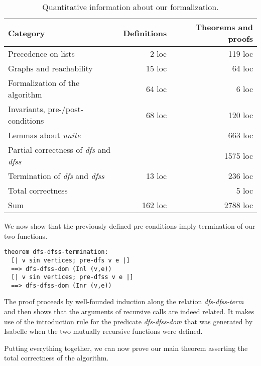 \documentclass[sigplan,10pt,anonymous,review]{acmart}
\newcommand{\prog}[1]{\textit{#1}}
\begin{document}
\begin{table*}
  \centering
  \begin{tabular}{|l|r|r|}
    \hline
    Category                         &  Definitions   &  Theorems and proofs\\
    \hline\hline
    Precedence on lists              &        2 loc   &         119 loc\\
    \hline
    Graphs and reachability          &       15 loc   &          64 loc\\
    \hline
    Formalization of the algorithm   &       64 loc   &           6 loc\\
    \hline
    Invariants, pre-/post-conditions &       68 loc   &         120 loc\\
    \hline
    Lemmas about \prog{unite}        &                &         663 loc\\
    \hline
    Partial correctness of \prog{dfs} and \prog{dfss} &  &     1575 loc\\
    \hline
    Termination of \prog{dfs} and \prog{dfss} & 13 loc   &      236 loc\\
    \hline
    Total correctness                &                &           5 loc\\
    \hline\hline
    Sum                              &      162 loc   &        2788 loc\\
    \hline
  \end{tabular}
  \caption{Quantitative information about our formalization.}
  \label{tab:effort}
\end{table*}

We now show that the previously defined pre-conditions imply termination of our two functions.

\begin{small}
\begin{lstlisting}[language=isabelle]
theorem dfs-dfss-termination:
  [| v sin vertices; pre-dfs v e |] 
  ==> dfs-dfss-dom (Inl (v,e))
  [| v sin vertices; pre-dfss v e |] 
  ==> dfs-dfss-dom (Inr (v,e))
\end{lstlisting}
\end{small}

The proof proceeds by well-founded induction along the relation \prog{dfs-dfss-term} and then shows that the arguments of recursive calls are indeed related. It makes use of the introduction rule for the predicate \prog{dfs-dfss-dom} that was generated by Isabelle when the two mutually recursive functions were defined.

Putting everything together, we can now prove our main theorem asserting the total correctness of the algorithm.
\end{document}
